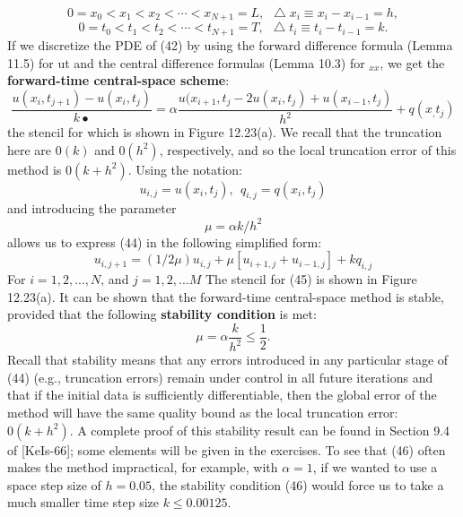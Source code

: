 \documentclass[../main.tex]{subfiles}
\begin{document}
$$0 = x_0 < x_1 < x_2 < \cdots < x_{N+1} =L,~~  \bigtriangleup x_i \equiv x_i - x_{i-1} = h,  $$
\begin{equation}
0 = t_0 < t_1 < t_2 < \cdots < t_{N+1} =T,~~  \bigtriangleup t_i \equiv t_i - t_{i-1} = k.
\end{equation}
If we discretize the PDE of (42) by using the forward difference formula (Lemma 11.5) for ut and the central difference formulas (Lemma 10.3) for $_{xx}$, we get the \textbf{forward-time central-space scheme}: 
\begin{equation}
\dfrac{u(x_i,t_{j+1})-u(x_i,t_{j})}{k•}=\alpha 
 \dfrac{u(x_{i+1},t_{j}-2u(x_{i},t_{j})+u(x_{i-1},t_{j})}{h^2}+q(x_,t_j)
\end{equation}
the stencil for which is shown in Figure 12.23(a). We recall that the truncation  here are $0(k)$ and $0(h^2)$, respectively, and so the local truncation error of this method is $0(k + h^2)$. Using the notation:
$$u_{i,j}=u(x_i,t_j), ~~q_{i,j}=q(x_i, t_j)$$
and introducing the parameter 
$$\mu=\alpha k/h^2$$
allows us to express (44) in the following simplified form: 
\begin{equation}
u_{i,j+1}=(1/2\mu)u_{i,j}+\mu[u_{i+1,j}+u_{i-1,j}]+kq_{i,j}
\end{equation}
For $i= 1,2, ...,N$, and $j= 1,2, ...M$ The stencil for (45) is shown in Figure 12.23(a). It can be shown that the forward-time central-space method is stable, 
provided that the following \textbf{stability condition} is met:
\begin{equation}
\mu=\alpha \dfrac{k}{h^2}\leqslant\dfrac{1}{2}.
\end{equation}
Recall that stability means that any errors introduced in any particular stage of (44) (e.g., truncation errors) remain under control in all future iterations and that if the initial data is sufficiently differentiable, then the global error of the method will have the same quality bound as the local truncation error: $0(k + h^2)$. A complete proof of this stability result can be found in Section 9.4 of [KeIs-66]; some elements will be given in the exercises. To see that (46) often makes the method impractical, for example, with $\alpha = 1$, if we wanted to use a space step size of $h= 0.05$, the stability condition (46) would force us to take a much smaller time step 
size $k\leqslant 0.00125$. 
\end{document}
